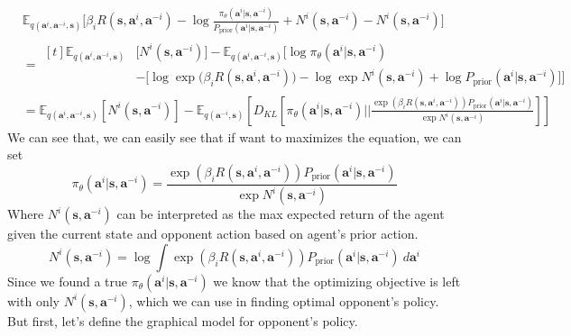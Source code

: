 \begin{equation}
    \begin{aligned}
        &\mathbb{E}_{q(\boldsymbol{a}^{i}, \boldsymbol{a}^{-i}, \boldsymbol{s})}\bigg[\beta_i R(\boldsymbol{s}, \boldsymbol{a}^i, \boldsymbol{a}^{-i}) - \log \frac{\pi_{\theta}(\boldsymbol{a}^{i} | \boldsymbol{s},\boldsymbol{a}^{-i})}{P_{\text{prior}}(\boldsymbol{a}^{i} | \boldsymbol{s}, \boldsymbol{a}^{-i})} + N^{i}(\boldsymbol{s}, \boldsymbol{a}^{-i}) - N^{i}(\boldsymbol{s}, \boldsymbol{a}^{-i}) \bigg] \\
        & = \begin{aligned}[t]
            \mathbb{E}_{q(\boldsymbol{a}^{i}, \boldsymbol{a}^{-i}, \boldsymbol{s})}&\bigg[ N^{i}(\boldsymbol{s}, \boldsymbol{a}^{-i}) \bigg] - \mathbb{E}_{q(\boldsymbol{a}^{i}, \boldsymbol{a}^{-i}, \boldsymbol{s})}\bigg[ \log \pi_{\theta}(\boldsymbol{a}^{i} | \boldsymbol{s},\boldsymbol{a}^{-i}) \\
            &- \bigg[ \log \exp\Big(\beta_i R(\boldsymbol{s}, \boldsymbol{a}^i, \boldsymbol{a}^{-i})\Big) - \log \exp N^{i}(\boldsymbol{s}, \boldsymbol{a}^{-i}) + \log P_{\text{prior}}(\boldsymbol{a}^{i} | \boldsymbol{s}, \boldsymbol{a}^{-i})  \bigg] \bigg]
        \end{aligned} \\
        &= \mathbb{E}_{q(\boldsymbol{a}^{i}, \boldsymbol{a}^{-i}, \boldsymbol{s})}\left[ N^{i}(\boldsymbol{s}, \boldsymbol{a}^{-i}) \right] - \mathbb{E}_{q(\boldsymbol{a}^{-i}, \boldsymbol{s})}\left[ D_{KL}\left[ \pi_{\theta}(\boldsymbol{a}^{i} | \boldsymbol{s},\boldsymbol{a}^{-i}) \Bigg|\Bigg| \frac{\exp(\beta_i R(\boldsymbol{s}, \boldsymbol{a}^i, \boldsymbol{a}^{-i})) P_{\text{prior}}(\boldsymbol{a}^{i} | \boldsymbol{s}, \boldsymbol{a}^{-i})}{ \exp N^{i}(\boldsymbol{s}, \boldsymbol{a}^{-i})} \right]\right] 
    \end{aligned}
\end{equation}
We can see that, we can easily see that if want to maximizes the equation, we can set 
\begin{equation}
    \pi_{\theta}(\boldsymbol{a}^{i} | \boldsymbol{s},\boldsymbol{a}^{-i}) = \frac{\exp(\beta_i R(\boldsymbol{s}, \boldsymbol{a}^i, \boldsymbol{a}^{-i})) P_{\text{prior}}(\boldsymbol{a}^{i} | \boldsymbol{s}, \boldsymbol{a}^{-i})}{ \exp N^{i}(\boldsymbol{s}, \boldsymbol{a}^{-i})}
\end{equation}
Where $N^{i}(\boldsymbol{s}, \boldsymbol{a}^{-i})$ can be interpreted as the max expected return of the agent given the current state and opponent action based on agent's prior action.
\begin{equation}
    N^{i}(\boldsymbol{s}, \boldsymbol{a}^{-i}) = \log \int \exp(\beta_i R(\boldsymbol{s}, \boldsymbol{a}^i, \boldsymbol{a}^{-i})) P_{\text{prior}}(\boldsymbol{a}^{i} | \boldsymbol{s}, \boldsymbol{a}^{-i}) \ d\boldsymbol{a}^i
\end{equation}
Since we found a true $\pi_{\theta}(\boldsymbol{a}^{i} | \boldsymbol{s},\boldsymbol{a}^{-i})$ we know that the optimizing objective is left with only $N^{i}(\boldsymbol{s}, \boldsymbol{a}^{-i})$, which we can use in finding optimal opponent's policy. But first, let's define the graphical model for opponent's policy.

